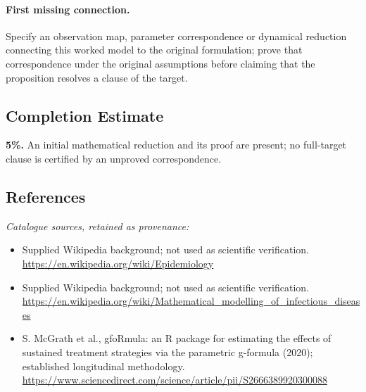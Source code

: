 \documentclass[11pt]{article}
\begin{document}
\paragraph{First missing connection.} Specify an observation map, parameter correspondence or dynamical reduction connecting this worked model to the original formulation; prove that correspondence under the original assumptions before claiming that the proposition resolves a clause of the target.
\subsection{Completion Estimate}
\textbf{5\%.} An initial mathematical reduction and its proof are present; no full-target clause is certified by an unproved correspondence.
\subsection{References}
\noindent\emph{Catalogue sources, retained as provenance:}
\begin{itemize}
\item Supplied Wikipedia background; not used as scientific verification. \url{https://en.wikipedia.org/wiki/Epidemiology}
\item Supplied Wikipedia background; not used as scientific verification. \url{https://en.wikipedia.org/wiki/Mathematical_modelling_of_infectious_diseases}
\item S. McGrath et al., gfoRmula: an R package for estimating the effects of sustained treatment strategies via the parametric g-formula (2020); established longitudinal methodology. \url{https://www.sciencedirect.com/science/article/pii/S2666389920300088}
\end{itemize}
\end{document}
